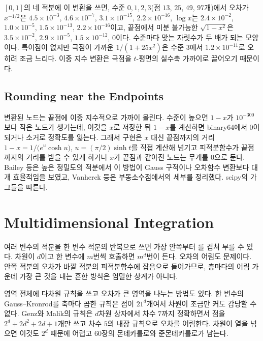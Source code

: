 $[0,1]$의 네 적분에 이 변환을 쓰면, 수준 $0,1,2,3$(점 $13$, $25$, $49$, $97$개)에서 오차가 $x^{-1/2}$은 $4.5\times10^{-3}$, $4.6\times10^{-7}$, $3.1\times10^{-15}$, $2.2\times10^{-16}$, $\log x$는 $2.4\times10^{-2}$, $1.0\times10^{-5}$, $1.5\times10^{-13}$, $2.2\times10^{-16}$이고, 끝점에서 미분 불가능한 $\sqrt{1-x^2}$은 $3.5\times10^{-2}$, $2.9\times10^{-5}$, $1.5\times10^{-12}$, $0$이다. 수준마다 맞는 자릿수가 두 배가 되는 모양이다. 특이점이 없지만 극점이 가까운 $1/(1+25x^2)$은 수준 $3$에서 $1.2\times10^{-11}$로 오히려 조금 느리다. 이중 지수 변환은 극점을 $t$-평면의 실수축 가까이로 끌어오기 때문이다.

\subsection{Rounding near the Endpoints}

변환된 노드는 끝점에 이중 지수적으로 가까이 몰린다. 수준이 높으면 $1-x$가 $10^{-300}$보다 작은 노드가 생기는데, 이것을 $x$로 저장한 뒤 $1-x$를 계산하면 binary64에서 $0$이 되거나 소거로 정확도를 잃는다. 그래서 구현은 $x$ 대신 끝점까지의 거리 $1-x=1/\bigl(e^{u}\cosh u\bigr)$, $u=(\pi/2)\sinh t$를 직접 계산해 넘기고 피적분함수가 끝점까지의 거리를 받을 수 있게 하거나 $x$가 끝점과 같아진 노드는 무게를 $0$으로 둔다. Bailey 등은 높은 정밀도의 적분에서 이 방법이 Gauss 구적이나 오차함수 변환보다 대개 효율적임을 보였고\cite{bailey2005}, Vanherck 등은 부동소수점에서의 세부를 정리했다\cite{vanherck2020}. scipy의 가 그들을 따른다.

\section{Multidimensional Integration}
\label{sec:multidim}

여러 변수의 적분을 한 변수 적분의 반복으로 쓰면 가장 안쪽부터 를 겹쳐 부를 수 있다. 차원이 $d$이고 한 변수에 $m$번씩 호출하면 $m^d$번이 든다. 오차의 어림도 문제이다. 안쪽 적분의 오차가 바깥 적분의 피적분함수에 잡음으로 들어가므로, 층마다의 어림 가운데 가장 큰 것을 내는 흔한 방식은 엄밀한 상계가 아니다.

영역 전체에 다차원 규칙을 쓰고 오차가 큰 영역을 나누는 방법도 있다. 한 변수의 Gauss--Kronrod를 축마다 곱한 규칙은 점이 $21^d$개여서 차원이 조금만 커도 감당할 수 없다. Genz와 Malik의 규칙은 $d$차원 상자에서 차수 $7$까지 정확하면서 점을 $2^d+2d^2+2d+1$개만 쓰고 차수 $5$의 내장 규칙으로 오차를 어림한다\cite{genz1980}. 차원이 열을 넘으면 이것도 $2^d$ 때문에 어렵고 60장의 몬테카를로와 준몬테카를로가 남는다.

